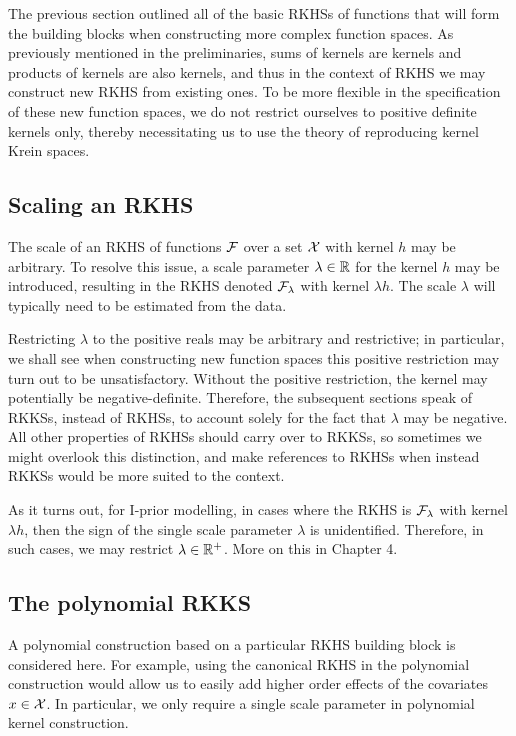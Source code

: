\documentclass[a4paper,showframe,11pt,draft]{report}
\begin{document}
The previous section outlined all of the basic RKHSs of functions that will form the building blocks when constructing more complex function spaces.
As previously mentioned in the preliminaries, sums of kernels are kernels and products of kernels are also kernels, and thus in the context of RKHS we may construct new RKHS from existing ones.
To be more flexible in the specification of these new function spaces, we do not restrict ourselves to positive definite kernels only, thereby necessitating us to use the theory of reproducing kernel Krein spaces.

\subsection{Scaling an RKHS}

The scale of an RKHS of functions ${\mathcal F}$ over a set ${\mathcal X}$ with kernel $h$ may be arbitrary.
To resolve this issue, a scale parameter $\lambda\in\mathbb{R}$ for the kernel $h$ may be introduced, resulting in the RKHS denoted ${\mathcal F}_\lambda$ with kernel $\lambda h$.
The scale $\lambda$ will typically need to be estimated from the data.

Restricting $\lambda$ to the positive reals may be arbitrary and restrictive; in particular, we shall see when constructing new function spaces this positive restriction may turn out to be unsatisfactory.
Without the positive restriction, the kernel may potentially be negative-definite.
Therefore, the subsequent sections speak of RKKSs, instead of RKHSs, to account solely for the fact that $\lambda$ may be negative.
All other properties of RKHSs should carry over to RKKSs, so sometimes we might overlook this distinction, and make references to RKHSs when instead RKKSs would be more suited to the context.
$\phantom{1}$
\begin{remark}
  As it turns out, for I-prior modelling, in cases where the RKHS is ${\mathcal F}_\lambda$ with kernel $\lambda h$, then the sign of the single scale parameter $\lambda$ is unidentified.
  Therefore, in such cases, we may restrict $\lambda\in\mathbb{R}^+$.
  More on this in Chapter 4.
\end{remark}

\subsection{The polynomial RKKS}

A polynomial construction based on a particular RKHS building block is considered here.
For example, using the canonical RKHS in the polynomial construction would allow us to easily add higher order effects of the covariates $x \in {\mathcal X}$.
In particular, we only require a single scale parameter in polynomial kernel construction.
\end{document}
